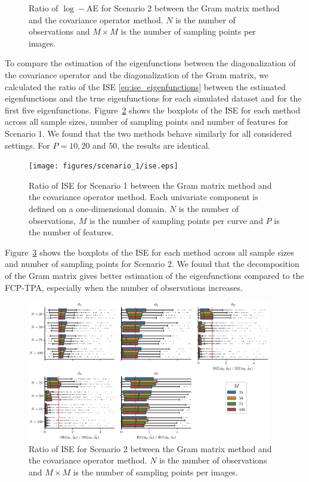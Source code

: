 \begin{results}
\begin{figure}
    \caption{Ratio of $\log-$AE for Scenario 2 between the Gram matrix method and the covariance operator method. $N$ is the number of observations and $M \times M$ is the number of sampling points per images.}
    \label{fig:logAE_mfd_2d}
\end{figure}
\end{results}

\begin{results}
To compare the estimation of the eigenfunctions between the diagonalization of the covariance operator and the diagonalization of the Gram matrix, we calculated the ratio of the ISE \eqref{eq:ise_eigenfunctions} between the estimated eigenfunctions and the true eigenfunctions for each simulated dataset and for the first five eigenfunctions.
Figure~\ref{fig:ise_mfd_1d} shows the boxplots of the ISE for each method across all sample sizes, number of sampling points and number of features for Scenario 1. We found that the two methods behave similarly for all considered settings. For $P = 10, 20$ and $50$, the results are identical.
\begin{figure}
     \centering
    \texttt{[image: figures/scenario\_1/ise.eps]}
    \caption{Ratio of ISE for Scenario 1 between the Gram matrix method and the covariance operator method. Each univariate component is defined on a one-dimensional domain. $N$ is the number of observations, $M$ is the number of sampling points per curve and $P$ is the number of features.}
    \label{fig:ise_mfd_1d}
\end{figure}
Figure~\ref{fig:ise_mfd_2d} shows the boxplots of the ISE for each method across all sample sizes and number of sampling points for Scenario 2. We found that the decomposition of the Gram matrix gives better estimation of the eigenfunctions compared to the FCP-TPA, especially when the number of observations increases.
\begin{figure}
     \centering
    \includegraphics[width=0.95\textwidth]{figures/scenario_2/ise.eps}
    \caption{Ratio of ISE for Scenario 2 between the Gram matrix method and the covariance operator method. $N$ is the number of observations and $M \times M$ is the number of sampling points per images.}
    \label{fig:ise_mfd_2d}
\end{figure}
\end{results}

